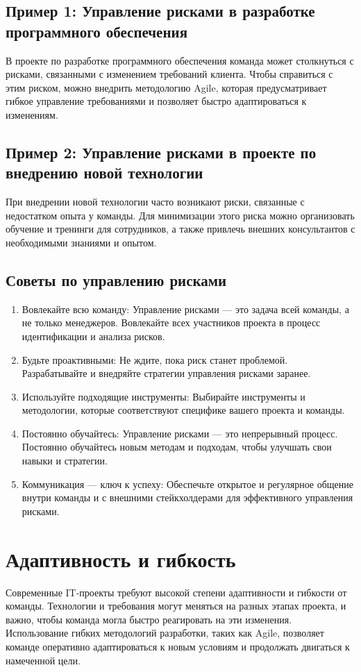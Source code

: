     \subsection*{Пример 1: Управление рисками в разработке программного обеспечения}
    В проекте по разработке программного обеспечения команда может столкнуться с рисками, связанными с изменением требований клиента. Чтобы справиться с этим риском, можно внедрить методологию Agile, которая предусматривает гибкое управление требованиями и позволяет быстро адаптироваться к изменениям.

    \subsection*{Пример 2: Управление рисками в проекте по внедрению новой технологии}
    При внедрении новой технологии часто возникают риски, связанные с недостатком опыта у команды. Для минимизации этого риска можно организовать обучение и тренинги для сотрудников, а также привлечь внешних консультантов с необходимыми знаниями и опытом.

    \subsection*{Советы по управлению рисками}
    \begin{enumerate}
        \item Вовлекайте всю команду: Управление рисками — это задача всей команды, а не только менеджеров. Вовлекайте всех участников проекта в процесс идентификации и анализа рисков.
        \item Будьте проактивными: Не ждите, пока риск станет проблемой. Разрабатывайте и внедряйте стратегии управления рисками заранее.
        \item Используйте подходящие инструменты: Выбирайте инструменты и методологии, которые соответствуют специфике вашего проекта и команды.
        \item Постоянно обучайтесь: Управление рисками — это непрерывный процесс. Постоянно обучайтесь новым методам и подходам, чтобы улучшать свои навыки и стратегии.
        \item Коммуникация — ключ к успеху: Обеспечьте открытое и регулярное общение внутри команды и с внешними стейкхолдерами для эффективного управления рисками.
    \end{enumerate}

    \section{Адаптивность и гибкость}
    Современные IT-проекты требуют высокой степени адаптивности и гибкости от команды. Технологии и требования могут меняться на разных этапах проекта, и важно, чтобы команда могла быстро реагировать на эти изменения. Использование гибких методологий разработки, таких как Agile, позволяет команде оперативно адаптироваться к новым условиям и продолжать двигаться к намеченной цели.

